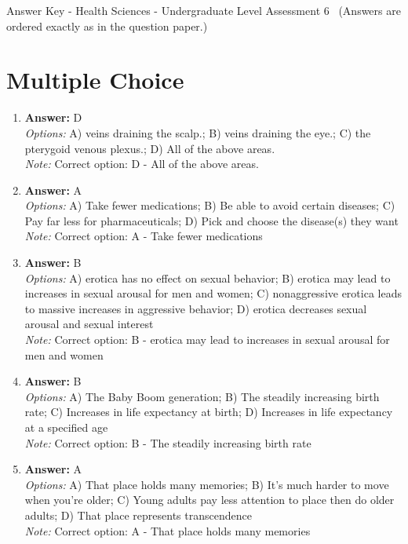 \documentclass[12pt]{article}
\begin{document}
\begin{center}
Answer Key - Health Sciences - Undergraduate Level Assessment 6 \
\small (Answers are ordered exactly as in the question paper.)
\end{center}

\section*{Multiple Choice}
\begin{enumerate}[label=\arabic*.]
\item \textbf{Answer:} D
\\ \textit{Options:} A) veins draining the scalp.; B) veins draining the eye.; C) the pterygoid venous plexus.; D) All of the above areas.
\\ \textit{Note:} Correct option: D - All of the above areas.
\item \textbf{Answer:} A
\\ \textit{Options:} A) Take fewer medications; B) Be able to avoid certain diseases; C) Pay far less for pharmaceuticals; D) Pick and choose the disease(s) they want
\\ \textit{Note:} Correct option: A - Take fewer medications
\item \textbf{Answer:} B
\\ \textit{Options:} A) erotica has no effect on sexual behavior; B) erotica may lead to increases in sexual arousal for men and women; C) nonaggressive erotica leads to massive increases in aggressive behavior; D) erotica decreases sexual arousal and sexual interest
\\ \textit{Note:} Correct option: B - erotica may lead to increases in sexual arousal for men and women
\item \textbf{Answer:} B
\\ \textit{Options:} A) The Baby Boom generation; B) The steadily increasing birth rate; C) Increases in life expectancy at birth; D) Increases in life expectancy at a specified age
\\ \textit{Note:} Correct option: B - The steadily increasing birth rate
\item \textbf{Answer:} A
\\ \textit{Options:} A) That place holds many memories; B) It's much harder to move when you're older; C) Young adults pay less attention to place then do older adults; D) That place represents transcendence
\\ \textit{Note:} Correct option: A - That place holds many memories
\end{enumerate}
\end{document}
